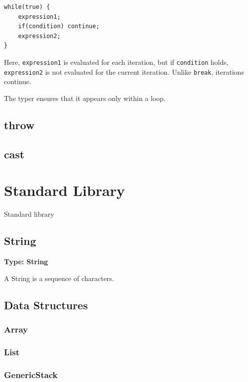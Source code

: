 \documentclass{article}
\newcommand{\expr}[1]{\texttt{#1}}
\newenvironment{myshaded}
  {\def\FrameCommand{\fboxsep=\topsep\colorbox{bgcolor}}%
  \MakeFramed {\advance\hsize-\width \FrameRestore}}%
 {\endMakeFramed}
\newcommand{\define}[3][Definition]
	{\begin{myshaded}\noindent\textbf{#1: #2}\par\nobreak\noindent\ignorespaces#3\label{def:#2}\end{myshaded}}
\begin{document}
\begin{lstlisting}
while(true) {
	expression1;
	if(condition) continue;
	expression2;
}
\end{lstlisting}

Here, \expr{expression1} is evaluated for each iteration, but if \expr{condition} holds, \expr{expression2} is not evaluated for the current iteration. Unlike \expr{break}, iterations continue.

The typer ensures that it appears only within a loop.


\subsection{throw}

\subsection{cast}
\label{Cast}




\section{Standard Library}
\label{Standard Library}

Standard library

\subsection{String}
\label{String}

\define[Type]{String}{A String is a sequence of characters.}

\subsection{Data Structures}
\subsubsection{Array}
\label{Array}

\subsubsection{List}
\subsubsection{GenericStack}
\end{document}
